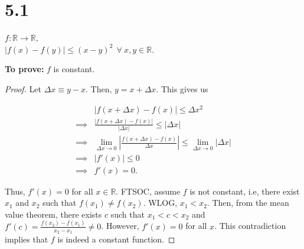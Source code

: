 \documentclass[12pt]{article}
\begin{document}
\pagebreak

\section{5.1}
$f:\mathbb{R}\to \mathbb{R}$,\\
$|f(x)-f(y)|\leq (x-y)^{2}\ \ \forall \ x, y \in \mathbb{R}$. 

{\bf To prove:} $f$ is constant.

\begin{proof}
      Let $\Delta x\equiv y-x$. Then, $y=x+\Delta x$. This gives us

      \begin{align*}
      & |f(x+\Delta x)-f(x)|\le \Delta x^{2}\\
      \implies  & \frac{{|f(x+\Delta x)-f(x)|}}{|\Delta x|}\le |\Delta x| \\
      \implies  & \lim_{ \Delta x \to 0 } \left|\frac{{f(x+\Delta x)-f(x)}}{\Delta x}\right|\le \lim_{ \Delta x \to 0 } |\Delta x| \\
      \implies  & |f'(x)|\le 0  \\
      \implies  & f'(x)=0.
      \end{align*}

      Thus, $f'(x)=0$ for all $x\in \mathbb{R}$. FTSOC, assume $f$ is not constant, i.e, 
      there exist $x_{1}$ and $x_{2}$ such that $f(x_{1})\ne f(x_{2})$. WLOG, $x_{1}<x_{2}$. Then, from the mean value theorem, there exists $c$ such that $x_{1}<c<x_{2}$ and $f'(c)=\frac{{f(x_{2})-f(x_{1})}}{x_{2}-x_{1}}\ne 0$. However, $f'(x)=0$ for all $x$. This contradiction implies that $f$ is indeed a constant function.
\end{proof}
\end{document}
